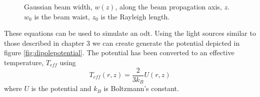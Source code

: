 \begin{figure}[h]
\centering
{}

\caption{Gaussian beam width, $w(z)$, along the beam propagation axis, $z$. $w_0$ is the beam waist, $z_0$ is the Rayleigh length.}
\end{figure}

These equations can be used to simulate an \gls{odt}. Using the light sources similar to those described in chapter 3 we can create generate the potential depicted in figure \ref{fig:dipolepotential}. The potential has been converted to an effective temperature, $T_{eff}$ using
\begin{equation}
T_{eff}(r, z) = \frac{2}{3 k_B} U(r, z)
\end{equation}
where $U$ is the potential and $k_B$ is Boltzmann's constant.

